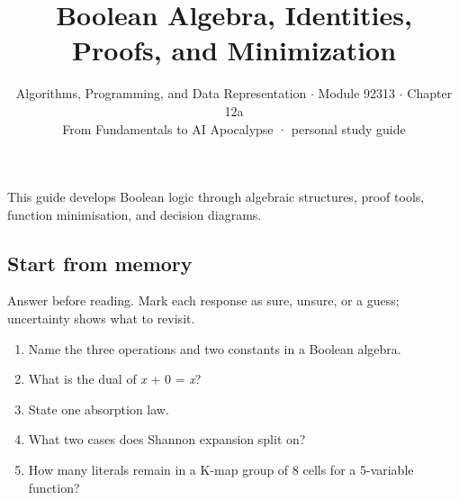 \documentclass[11pt]{article}
\title{\sffamily\bfseries\color{FAUblue}Boolean Algebra, Identities, Proofs, and Minimization}
\author{Algorithms, Programming, and Data Representation \ensuremath{\cdot} Module 92313 \ensuremath{\cdot} Chapter 12a\\[2pt]\small From Fundamentals to AI Apocalypse · personal study guide}
\date{}
\begin{document}
\maketitle
\begingroup\footnotesize\setlength{\parskip}{0pt}\tableofcontents\endgroup
\clearpage

{\large This guide develops Boolean logic through algebraic structures, proof tools, function minimisation, and decision diagrams.}


\begin{keepsection}
\section{Start from memory}

Answer before reading. Mark each response as sure, unsure, or a guess; uncertainty shows what to revisit.

\begin{enumerate}
\item Name the three operations and two constants in a Boolean algebra.
\item What is the dual of \textit{x} + 0 = \textit{x}?
\item State one absorption law.
\item What two cases does Shannon expansion split on?
\item How many literals remain in a K-map group of 8 cells for a 5-variable function?
\end{enumerate}

\end{keepsection}
\end{document}
